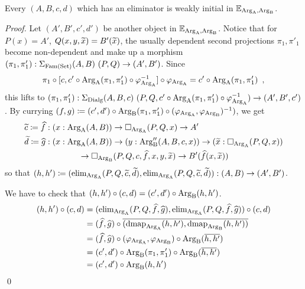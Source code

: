 \documentclass[orivec,envcountsame, ,envcountsect]{llncs}
\begin{document}
\begin{proposition}
\label{thm:elim-to-weak-init}
  Every $(A, B, c, d)$ which has an eliminator is weakly initial in $\mathbb{E}_{\text{Arg}_{\text{A}}, \text{Arg}_{\text{B}}}$.
\end{proposition}
\begin{proof}
  Let $(A', B', c', d')$ be another object in
  $\mathbb{E}_{\text{Arg}_{\text{A}}, \text{Arg}_{\text{B}}}$. Notice that for $P(x) = A'$, $Q(x, y,
  \widetilde{x}) = B'(\widetilde{x})$, the usually dependent second
  projections $\pi_1, \pi'_1$ become non-dependent and make up a
  morphism $(\pi_1, \pi'_1) : \Sigma_{\text{Fam}(\text{Set})} (A, B)\ (P, Q) \to (A', B')$. 
  Since
   \[
   \pi_1 \circ [c, c' \circ \text{Arg}_{\text{A}}(\pi_1, \pi'_1) \circ \varphi_{\text{Arg}_{\text{A}}}^{-1}]
         \circ \varphi_{\text{Arg}_{\text{A}}} = c' \circ \text{Arg}_{\text{A}}(\pi_1, \pi'_1) \enspace ,
   \]
   this lifts to $(\pi_1, \pi'_1) : \Sigma_{\text{Dialg}} (A, B, c)\ (P, Q, c'
   \circ \text{Arg}_{\text{A}}(\pi_1, \pi'_1) \circ \varphi_{\text{Arg}_{\text{A}}}^{-1}) \to (A', B',
   c')$. By currying $(f, g) \coloneqq (c', d') \circ \text{Arg}_{\text{B}}(\pi_1,
   \pi'_1) \circ (\varphi_{\text{Arg}_{\text{A}}}, \varphi_{\text{Arg}_{\text{B}}})^{-1})$, we get
   \begin{align*} 
     \widetilde{c} \coloneqq \widehat{f} &: (x : \text{Arg}_{\text{A}}(A, B)) \to \Box_{\text{Arg}_{\text{A}}}(P, Q, x) \to A' \\ 
     \widetilde{d} \coloneqq \widehat{g} &: (x : \text{Arg}_{\text{A}}(A, B)) \to (y : \text{Arg}_{\text{B}}''(A, B, c, x))
     \to
     (\widetilde{x} : \Box_{\text{Arg}_{\text{A}}}(P, Q, x))  \\
     & \qquad\qquad \to \Box_{\text{Arg}_{\text{B}}}(P, Q, c, \widehat{f}, x, y,
     \widetilde{x}) \to B'(\widehat{f}(x, \widetilde{x}))
   \end{align*}
   so that $(h, h') \coloneqq (\text{elim}_{\text{Arg}_{\text{A}}}(P, Q, \widetilde{c}, \widetilde{d}),
   \text{elim}_{\text{Arg}_{\text{A}}}(P, Q, \widetilde{c}, \widetilde{d})) : (A, B) \to (A', B')$.

   We have to check that $(h, h') \circ (c, d) = (c', d') \circ \text{Arg}_{\text{B}}(h, h')$.
   \begin{align*}
     (h, h') \circ (c, d)
     &= (\text{elim}_{\text{Arg}_{\text{A}}}(P, Q, \widehat{f}, \widehat{g}),
          \text{elim}_{\text{Arg}_{\text{A}}}(P, Q, \widehat{f}, \widehat{g})) \circ (c, d) \\
     &= (\widehat{f}, \widehat{g}) \circ \overline{(\text{dmap}_{\text{Arg}_{\text{A}}}(h, h'), \text{dmap}_{\text{Arg}_{\text{B}}}(h, h'))} \\
     &= (\widehat{f}, \widehat{g}) \circ (\varphi_{\text{Arg}_{\text{A}}}, \varphi_{\text{Arg}_{\text{B}}}) \circ \text{Arg}_{\text{B}}(\overline{h, h'}) \\
     &= (c', d') \circ \text{Arg}_{\text{B}}(\pi_1, \pi'_1) \circ \text{Arg}_{\text{B}}(\overline{h, h'}) \\
     &= (c', d') \circ \text{Arg}_{\text{B}}(h, h')
   \end{align*}
\mbox{} \qed %
\end{proof}
\end{document}
